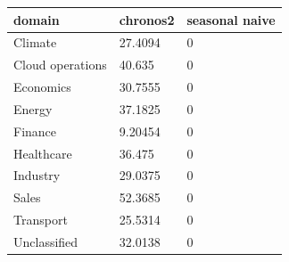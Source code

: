 \begin{tabular}{lll}
\toprule
domain & chronos2 & seasonal naive \\
\midrule
Climate & 27.4094 & 0 \\
Cloud operations & 40.635 & 0 \\
Economics & 30.7555 & 0 \\
Energy & 37.1825 & 0 \\
Finance & 9.20454 & 0 \\
Healthcare & 36.475 & 0 \\
Industry & 29.0375 & 0 \\
Sales & 52.3685 & 0 \\
Transport & 25.5314 & 0 \\
Unclassified & 32.0138 & 0 \\
\bottomrule
\end{tabular}
